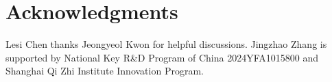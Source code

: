 \documentclass[twoside,11pt]{article}
\begin{document}
\section*{Acknowledgments}

Lesi Chen thanks Jeongyeol Kwon for helpful discussions.
Jingzhao Zhang is supported by National Key R\&D Program of China 2024YFA1015800 and Shanghai Qi Zhi Institute Innovation Program. 


\appendix



\end{document}
